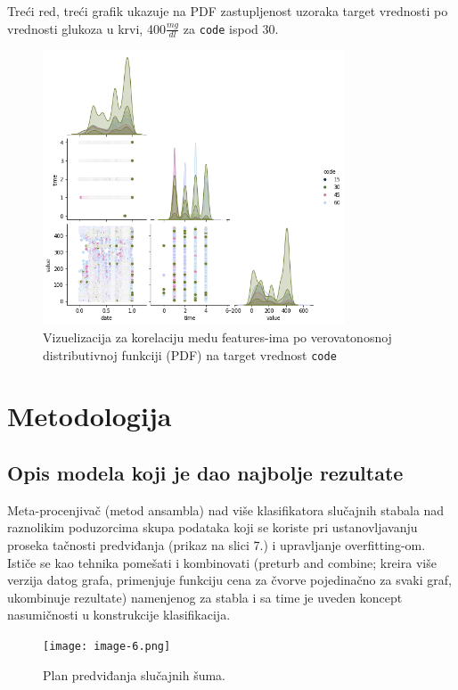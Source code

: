 \documentclass[fontsize=12bp, paper=a4]{scrarticle}
\begin{document}
Treći red, treći grafik ukazuje na PDF zastupljenost uzoraka target vrednosti po vrednosti glukoza u krvi, 400$\frac{mg}{dl}$ za \verb|code| ispod 30.
\begin{figure}[h]
    \centering
    \includegraphics[width=0.8\textwidth]{1.png}
    \caption{\centering Vizuelizacija za korelaciju medu features-ima po verovatonosnoj distributivnoj
    funkciji (PDF) na target vrednost \texttt{code}}
\end{figure}

\section{Metodologija}
\subsection{Opis modela koji je dao najbolje rezultate}
Meta-procenjivač (metod ansambla) nad više klasifikatora slučajnih stabala nad raznolikim poduzorcima skupa podataka koji se koriste pri ustanovljavanju proseka tačnosti predviđanja (prikaz na slici 7.) i upravljanje overfitting-om.\cite{ensamblerf}\cite{rf} Ističe se kao tehnika pomešati i kombinovati (preturb and combine; kreira više verzija datog grafa, primenjuje funkciju cena za čvorve pojedinačno za svaki graf, ukombinuje rezultate\cite{pnc}) namenjenog za stabla i sa time je uveden koncept nasumičnosti u konstrukcije klasifikacija. 

\begin{figure}[h!]
    \centering
    \texttt{[image: image-6.png]}
    \caption{Plan predviđanja slučajnih šuma.}
\end{figure}
\end{document}
